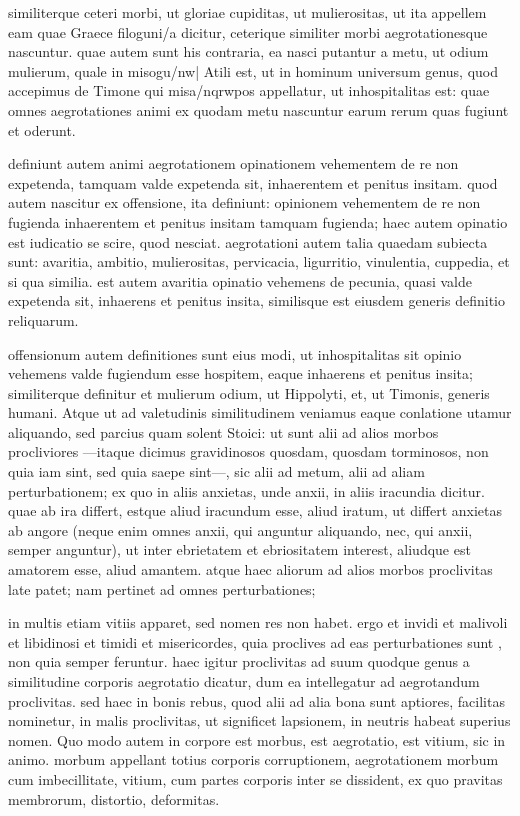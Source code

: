  similiterque ceteri morbi, ut gloriae cupiditas, ut mulierositas, ut ita appellem eam quae Graece filoguni/a dicitur, ceterique similiter morbi aegrotationesque nascuntur. quae autem sunt his contraria, ea nasci putantur a metu, ut odium mulierum, quale in misogu/nw| Atili est, ut in hominum universum genus, quod accepimus de Timone qui misa/nqrwpos appellatur, ut inhospitalitas est: quae omnes aegrotationes animi ex quodam metu nascuntur earum rerum quas fugiunt et oderunt.

 definiunt autem animi aegrotationem opinationem vehementem de re non expetenda, tamquam valde expetenda sit, inhaerentem et penitus insitam. quod autem nascitur ex offensione, ita definiunt: opinionem vehementem de re non fugienda inhaerentem et penitus insitam tamquam fugienda; haec autem opinatio est iudicatio se scire, quod nesciat. aegrotationi autem talia quaedam subiecta sunt: avaritia, ambitio, mulierositas, pervicacia, ligurritio, vinulentia, cuppedia, et si qua similia. est autem avaritia opinatio vehemens de pecunia, quasi valde expetenda sit, inhaerens et penitus insita, similisque est eiusdem generis definitio reliquarum.

 offensionum autem definitiones sunt eius modi, ut inhospitalitas sit opinio vehemens valde fugiendum esse hospitem, eaque inhaerens et penitus insita; similiterque definitur et mulierum odium, ut Hippolyti, et, ut Timonis, generis humani. Atque ut ad valetudinis similitudinem veniamus eaque conlatione utamur aliquando, sed parcius quam solent Stoici: ut sunt alii ad alios morbos procliviores —itaque dicimus gravidinosos quosdam, quosdam torminosos, non quia iam sint, sed quia saepe sint—, sic alii ad metum, alii ad aliam perturbationem; ex quo in aliis anxietas, unde anxii, in aliis iracundia dicitur. quae ab ira differt, estque aliud iracundum esse, aliud iratum, ut differt anxietas ab angore (neque enim omnes anxii, qui anguntur aliquando, nec, qui anxii, semper anguntur), ut inter ebrietatem et ebriositatem interest, aliudque est amatorem esse, aliud amantem. atque haec aliorum ad alios morbos proclivitas late patet; nam pertinet ad omnes perturbationes;

 in multis etiam vitiis apparet, sed nomen res non habet. ergo et invidi et malivoli et libidinosi et timidi et misericordes, quia proclives ad eas perturbationes sunt , non quia semper feruntur. haec igitur proclivitas ad suum quodque genus a similitudine corporis aegrotatio dicatur, dum ea intellegatur ad aegrotandum proclivitas. sed haec in bonis rebus, quod alii ad alia bona sunt aptiores, facilitas nominetur, in malis proclivitas, ut significet lapsionem, in neutris habeat superius nomen. Quo modo autem in corpore est morbus, est aegrotatio, est vitium, sic in animo. morbum appellant totius corporis corruptionem, aegrotationem morbum cum imbecillitate, vitium, cum partes corporis inter se dissident, ex quo pravitas membrorum, distortio, deformitas.


